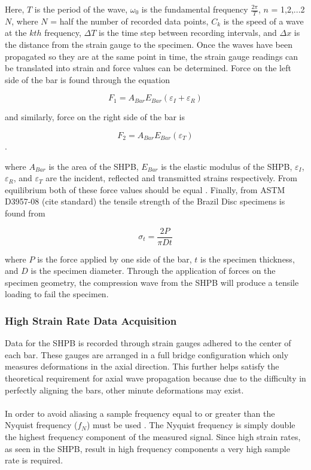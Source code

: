 \documentclass[12pt]{article}
\begin{document}
Here, $T$ is the period of the wave, $\omega_0$ is the fundamental frequency $\frac{2\pi}{T}$, $n$ = 1,2,...2$N$, where $N$ = half the number of recorded data points, $C_k$ is the speed of a wave at the $kth$ frequency, $\Delta T$ is the time step between recording intervals, and $\Delta x$ is the distance from the strain gauge to the specimen\cite{Gama}. Once the waves have been propagated so they are at the same point in time, the strain gauge readings can be translated into strain and force values can be determined. Force on the left side of the bar is found through the equation 

\begin{equation}
F_1 = A_{Bar}E_{Bar}(\varepsilon_I + \varepsilon_R)
\end{equation}

and similarly, force on the right side of the bar is

\begin{equation}
F_2 = A_{Bar}E_{Bar}(\varepsilon_T)
\end{equation}.

where $A_{Bar}$ is the area of the SHPB, $E_{Bar}$ is the elastic modulus of the SHPB, $\varepsilon_I$, $\varepsilon_R$, and $\varepsilon_T$ are the incident, reflected and transmitted strains respectively. From equilibrium both of these force values should be equal . Finally, from ASTM D3957-08 (cite standard) the tensile strength of the Brazil Disc specimens is found from

\begin{equation}
\sigma_t = \frac{2P}{\pi Dt}
\label{eq:stress}
\end{equation}

where $P$ is the force applied by one side of the bar, $t$ is the specimen thickness, and $D$ is the specimen diameter. Through the application of forces on the specimen geometry, the compression wave from the SHPB will produce a tensile loading to fail the specimen.

\subsubsection{High Strain Rate Data Acquisition} %
Data for the SHPB is recorded through strain gauges adhered to the center of each bar. These gauges are arranged in a full bridge configuration which only measures deformations in the axial direction. This further helps satisfy the theoretical requirement for axial wave propagation because due to the difficulty in perfectly aligning the bars, other minute deformations may exist.
\\ \\
In order to avoid aliasing a sample frequency equal to or greater than the Nyquist frequency ($f_N$) must be used \cite{Sampling}. The Nyquist frequency is simply double the highest frequency component of the measured signal. Since high strain rates, as seen in the SHPB, result in high frequency components a very high sample rate is required. 
\end{document}
